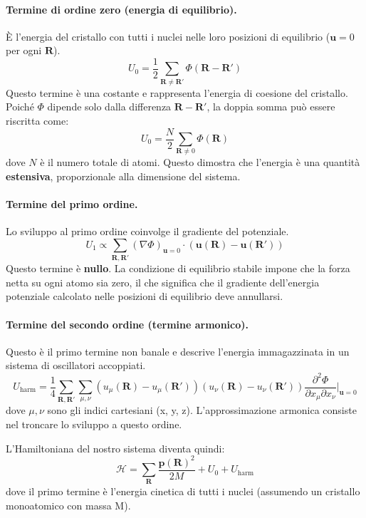 \paragraph{Termine di ordine zero (energia di equilibrio).}
È l'energia del cristallo con tutti i nuclei nelle loro posizioni di equilibrio (\(\mathbf{u}=0\) per ogni \(\mathbf{R}\)).
\[ U_0 = \frac{1}{2} \sum_{\mathbf{R} \neq \mathbf{R'}} \Phi(\mathbf{R} - \mathbf{R'}) \]
Questo termine è una costante e rappresenta l'energia di coesione del cristallo. Poiché \(\Phi\) dipende solo dalla differenza \(\mathbf{R}-\mathbf{R'}\), la doppia somma può essere riscritta come:
\[ U_0 = \frac{N}{2} \sum_{\mathbf{R} \neq 0} \Phi(\mathbf{R}) \]
dove \(N\) è il numero totale di atomi. Questo dimostra che l'energia è una quantità \textbf{estensiva}, proporzionale alla dimensione del sistema.

\paragraph{Termine del primo ordine.}
Lo sviluppo al primo ordine coinvolge il gradiente del potenziale.
\[ U_1 \propto \sum_{\mathbf{R}, \mathbf{R'}} (\nabla \Phi)_{\mathbf{u}=0} \cdot (\mathbf{u}(\mathbf{R}) - \mathbf{u}(\mathbf{R'})) \]
Questo termine è \textbf{nullo}. La condizione di equilibrio stabile impone che la forza netta su ogni atomo sia zero, il che significa che il gradiente dell'energia potenziale calcolato nelle posizioni di equilibrio deve annullarsi.

\paragraph{Termine del secondo ordine (termine armonico).}
Questo è il primo termine non banale e descrive l'energia immagazzinata in un sistema di oscillatori accoppiati.
\[ U_{\text{harm}} = \frac{1}{4} \sum_{\mathbf{R}, \mathbf{R'}} \sum_{\mu, \nu} (u_\mu(\mathbf{R}) - u_\mu(\mathbf{R'})) (u_\nu(\mathbf{R}) - u_\nu(\mathbf{R'})) \frac{\partial^2 \Phi}{\partial x_\mu \partial x_\nu} \bigg|_{\mathbf{u}=0} \]
dove \(\mu, \nu\) sono gli indici cartesiani (x, y, z). L'approssimazione armonica consiste nel troncare lo sviluppo a questo ordine.

L'Hamiltoniana del nostro sistema diventa quindi:
\[ \mathcal{H} = \sum_{\mathbf{R}} \frac{\mathbf{p}(\mathbf{R})^2}{2M} + U_0 + U_{\text{harm}} \]
dove il primo termine è l'energia cinetica di tutti i nuclei (assumendo un cristallo monoatomico con massa M).

